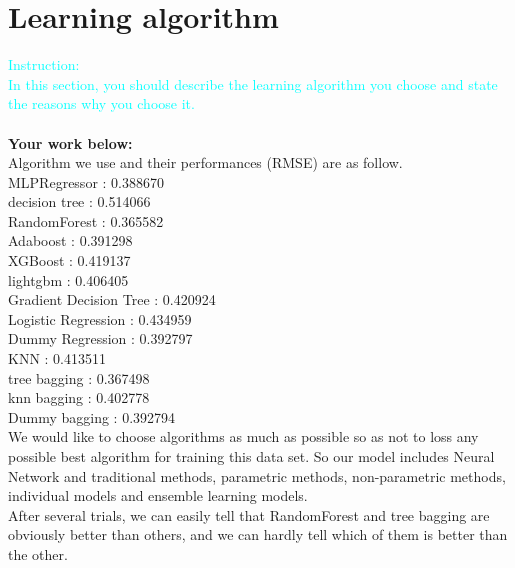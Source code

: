 \documentclass{article}
\begin{document}
\section{Learning algorithm}
\textcolor{cyan}{Instruction: \\
  In this section, you should describe the learning algorithm you choose and state the reasons why you choose it.}\\\\
\textbf{Your work below:}\\
Algorithm we use and their performances (RMSE) are as follow.\\
MLPRegressor : 0.388670\\
decision tree : 0.514066\\
RandomForest : 0.365582\\
Adaboost : 0.391298\\
XGBoost : 0.419137\\
lightgbm : 0.406405\\
Gradient Decision Tree : 0.420924\\
Logistic Regression : 0.434959\\
Dummy Regression : 0.392797\\
KNN : 0.413511\\
tree bagging : 0.367498\\
knn bagging : 0.402778\\
Dummy bagging : 0.392794\\
We would like to choose algorithms as much as possible so as not to loss any possible best algorithm for training this data set. So our model includes Neural Network and
traditional methods, parametric methods, non-parametric methods, individual models and ensemble learning models.\\
After several trials, we can easily tell that RandomForest and tree bagging are obviously better than others, and we can hardly tell which of them is better than the other.
\end{document}
